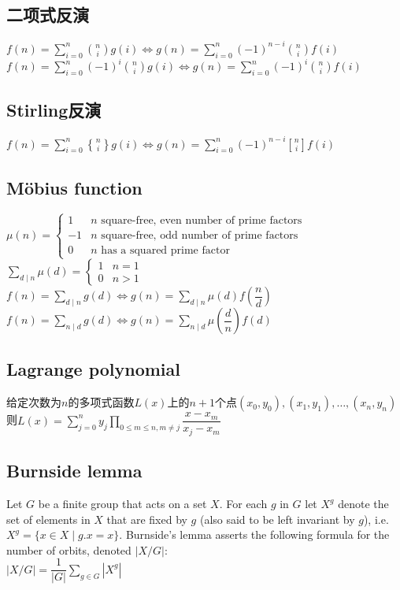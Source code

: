 \subsection*{二项式反演}
    $ f(n) = \sum\limits_{i = 0}^{n} \binom{n}{i} g(i) \Leftrightarrow g(n) = \sum\limits_{i = 0}^{n} (-1)^{n - i} \binom{n}{i} f(i) $
    \\$ f(n) = \sum\limits_{i = 0}^{n} (-1)^i \binom{n}{i} g(i) \Leftrightarrow g(n) = \sum\limits_{i = 0}^{n} (-1)^i \binom{n}{i} f(i) $

\subsection*{Stirling反演}
    $ f(n) = \sum\limits_{i = 0}^{n} { n \brace i} g(i) \Leftrightarrow g(n) = \sum\limits_{i = 0}^{n} (-1)^{n - i} {n \brack i} f(i) $

\subsection*{Möbius function}
    $ \mu(n) = \begin{cases}
        1 & n \text{ square-free, even number of prime factors}\\
        -1 & n \text{ square-free, odd number of prime factors}\\
        0 & n \text{ has a squared prime factor}
    \end{cases} $
    \\$ \sum\limits_{d \mid n} \mu(d) = \begin{cases}
        1 & n = 1\\
        0 & n > 1
    \end{cases} $
    \\$ f(n) = \sum\limits_{d \mid n} g(d) \Leftrightarrow g(n) = \sum\limits_{d \mid n} \mu(d) f(\dfrac{n}{d}) $
    \\$ f(n) = \sum\limits_{n \mid d} g(d) \Leftrightarrow g(n) = \sum\limits_{n \mid d} \mu(\dfrac{d}{n}) f(d) $

\subsection*{Lagrange polynomial}
    给定次数为$ n $的多项式函数$ L(x) $上的$ n + 1 $个点$ (x_0, y_0), (x_1, y_1), \dots, (x_n, y_n) $
    \\则$ L(x) = \sum\limits_{j = 0}^{n} y_j \prod\limits_{0 \leq m \leq n, m \ne j} \dfrac{x - x_m}{x_j - x_m} $

\subsection*{Burnside lemma}
    Let $ G $ be a finite group that acts on a set $ X $. For each $ g $ in $ G $ let $ X^g $ denote the set of elements in $ X $ that are fixed by $ g $ (also said to be left invariant by $ g $), i.e. $ X^g = \lbrace x \in X \mid g.x = x \rbrace $. Burnside's lemma asserts the following formula for the number of orbits, denoted $ \left| X / G \right| $:
    \\$ \left| X / G \right| = \dfrac{1}{\left| G \right|} \sum\limits_{g \in G}^{} \left| X^g \right| $

